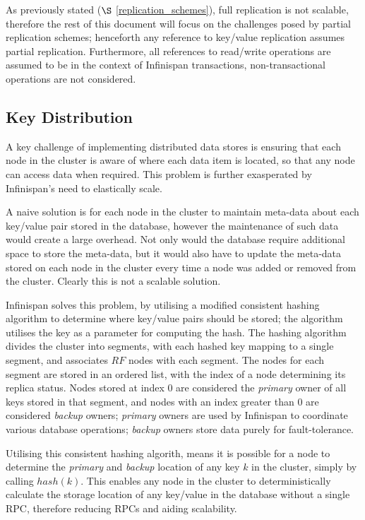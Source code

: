 As previously stated ($\S$ \ref{replication_schemes}), full replication is not scalable, therefore the rest of this document will focus on the challenges posed by partial replication schemes; henceforth any reference to key/value replication assumes partial replication.  Furthermore, all references to read/write operations are assumed to be in the context of Infinispan transactions, non-transactional operations are not considered.  

    \subsection{Key Distribution}
    A key challenge of implementing distributed data stores is ensuring that each node in the cluster is aware of where each data item is located, so that any node can access data when required.  This problem is further exasperated by Infinispan's need to elastically scale.  
    
    A naive solution is for each node in the cluster to maintain meta-data about each key/value pair stored in the database, however the maintenance of such data would create a large overhead.  Not only would the database require additional space to store the meta-data, but it would also have to update the meta-data stored on each node in the cluster every time a node was added or removed from the cluster.  Clearly this is not a scalable solution.  
    
    Infinispan solves this problem, by utilising a modified consistent hashing algorithm\citep{Karger:1997:CHR:258533.258660, Infinispan, Ruivo:2011:ETO:2120967.2121604} to determine where key/value pairs should be stored; the algorithm utilises the key as a parameter for computing the hash.  The hashing algorithm divides the cluster into segments, with each hashed key mapping to a single segment, and associates $RF$ nodes with each segment. The nodes for each segment are stored in an ordered list, with the index of a node determining its replica status.  Nodes stored at index 0 are considered the \emph{primary} owner of all keys stored in that segment, and nodes with an index greater than 0 are considered \emph{backup} owners; \emph{primary} owners are used by Infinispan to coordinate various database operations; \emph{backup} owners store data purely for fault-tolerance.  
 
    Utilising this consistent hashing algorith, means it is possible for a node to determine the \emph{primary} and \emph{backup} location of any key $k$ in the cluster, simply by calling $hash(k)$. This enables any node in the cluster to deterministically calculate the storage location of any key/value in the database without a single RPC, therefore reducing RPCs and aiding scalability.  
    

